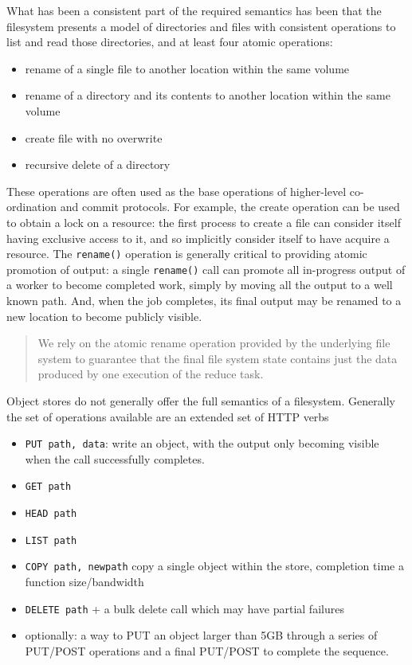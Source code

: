 \documentclass[9pt,technote]{IEEEtran}
\begin{document}
What has been a consistent part of the required semantics has been that the filesystem presents a model of directories and files with consistent operations to list and read those directories, and at least four atomic operations: 
\begin{itemize}
  \item{rename of a single file to another location within the same volume}
  \item{rename of a directory and its contents to another location within the same volume}
  \item{create file with no overwrite}
  \item{recursive delete of a directory}
\end{itemize}

These operations are often used as the base operations of higher-level co-ordination and commit protocols. For example, the create operation can be used to obtain a lock on a resource: the first process to create a file can consider itself having exclusive access to it, and so implicitly consider itself to have acquire a resource. The \texttt{rename()} operation is generally critical to providing atomic promotion of output: a single \texttt{rename()} call can promote all in-progress output of a worker to become completed work, simply by moving all the output to a well known path. And, when the job completes, its final output may be renamed to a new location to become publicly visible.


\begin{quote}
We rely on the atomic rename operation provided by the underlying file system to guarantee that the final file system state contains just the data produced by one execution of the reduce task.
\end{quote}
\cite{Dean:2004:MSD:1251254.1251264}

Object stores do not generally offer the full semantics of a filesystem. Generally the set of operations available are an extended set of HTTP verbs

\begin{itemize}
  \item{\texttt{PUT path, data}: write an object, with the output only becoming visible when the call successfully completes.}
  \item{\texttt{GET path}}
  \item{\texttt{HEAD path}}
  \item{\texttt{LIST path}}
  \item{\texttt{COPY path, newpath} copy a single object within the store, completion time a function size/bandwidth}
  \item{\texttt{DELETE path}  + a bulk delete call which may have partial failures}
  \item{optionally: a way to PUT an object larger than 5GB through a series of PUT/POST operations and a final PUT/POST to complete the sequence.}
\end{itemize}
\end{document}
